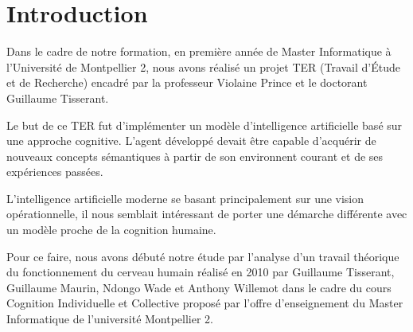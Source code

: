 \chapter*{Introduction}
Dans le cadre de notre formation, en première année de Master Informatique à l'Université de Montpellier 2, nous avons réalisé un projet TER (Travail d'Étude et de Recherche) encadré par la professeur \mbox{Violaine} \mbox{Prince} et le doctorant \mbox{Guillaume} \mbox{Tisserant}.

Le but de ce TER fut d'implémenter un modèle d'intelligence artificielle basé sur une approche cognitive. L'agent développé devait être capable d'acquérir de nouveaux concepts sémantiques à partir de son environnent courant et de ses expériences passées.

L'intelligence artificielle moderne se basant principalement sur une vision opérationnelle, il nous semblait intéressant de porter une démarche différente avec un modèle proche de la cognition humaine.

Pour ce faire, nous avons débuté notre étude par l'analyse d'un travail théorique du fonctionnement du cerveau humain réalisé en 2010 par \mbox{Guillaume} \mbox{Tisserant}, \mbox{Guillaume} \mbox{Maurin}, \mbox{Ndongo} \mbox{Wade} et \mbox{Anthony} \mbox{Willemot} dans le cadre du cours \og Cognition Individuelle et Collective\fg{} proposé par l'offre d'enseignement du Master Informatique de l'université Montpellier 2.
